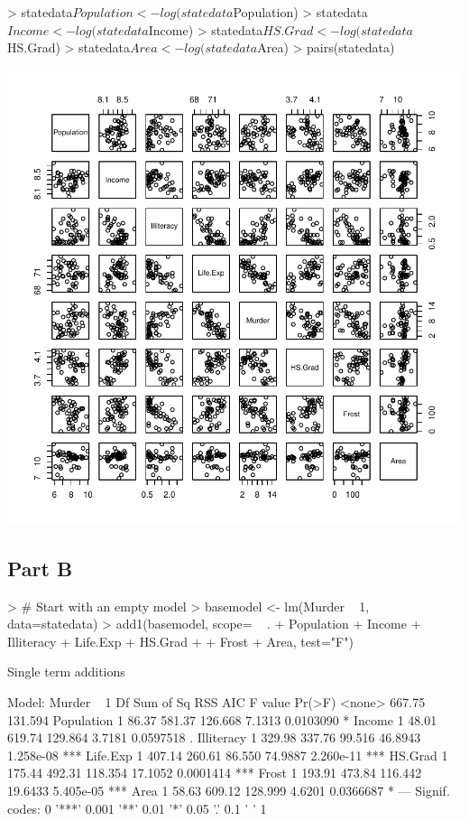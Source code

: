\documentclass{article}
\begin{document}
\begin{Schunk}
\begin{Sinput}
> statedata$Population <- log(statedata$Population)
> statedata$Income <- log(statedata$Income)
> statedata$HS.Grad <- log(statedata$HS.Grad)
> statedata$Area <- log(statedata$Area)
> pairs(statedata)
\end{Sinput}
\end{Schunk}
\includegraphics{Assignment2-008}

\subsection{Part B}
\begin{Schunk}
\begin{Sinput}
> # Start with an empty model
> basemodel <- lm(Murder ~ 1, data=statedata)
> add1(basemodel, scope= ~ . + Population + Income + Illiteracy + Life.Exp + HS.Grad + 
+        Frost + Area, test="F")
\end{Sinput}
\begin{Soutput}
Single term additions

Model:
Murder ~ 1
           Df Sum of Sq    RSS     AIC F value    Pr(>F)    
<none>                  667.75 131.594                      
Population  1     86.37 581.37 126.668  7.1313 0.0103090 *  
Income      1     48.01 619.74 129.864  3.7181 0.0597518 .  
Illiteracy  1    329.98 337.76  99.516 46.8943 1.258e-08 ***
Life.Exp    1    407.14 260.61  86.550 74.9887 2.260e-11 ***
HS.Grad     1    175.44 492.31 118.354 17.1052 0.0001414 ***
Frost       1    193.91 473.84 116.442 19.6433 5.405e-05 ***
Area        1     58.63 609.12 128.999  4.6201 0.0366687 *  
---
Signif. codes:  0 '***' 0.001 '**' 0.01 '*' 0.05 '.' 0.1 ' ' 1
\end{Soutput}
\end{Schunk}
\end{document}
